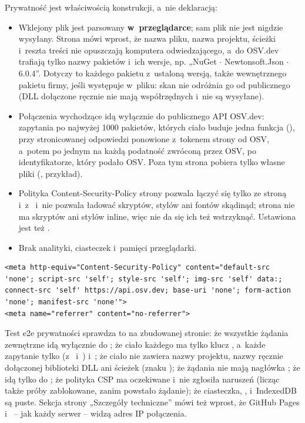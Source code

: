 Prywatność jest właściwością konstrukcji, a~nie deklaracją:

\begin{itemize}
  \item Wklejony plik jest parsowany \textbf{w~przeglądarce}; sam plik nie jest nigdzie
        wysyłany. Strona mówi wprost, że nazwa pliku, nazwa projektu, ścieżki i~reszta
        treści nie opuszczają komputera odwiedzającego, a~do OSV.dev trafiają tylko nazwy
        pakietów i~ich wersje, np. „NuGet $\cdot$ Newtonsoft.Json $\cdot$ 6.0.4”. Dotyczy to
        każdego pakietu z~ustaloną wersją, także wewnętrznego pakietu firmy, jeśli występuje
        w~pliku: skan nie odróżnia go od publicznego (DLL dołączone ręcznie nie mają współrzędnych
        i~nie są wysyłane).
  \item Połączenia wychodzące idą wyłącznie do publicznego API OSV.dev: zapytania
         po najwyżej 1000 pakietów, których ciało buduje jedna funkcja
        (), przy stronicowanej odpowiedzi ponowione z~tokenem strony od
        OSV, a~potem po jednym  na każdą podatność zwróconą przez OSV, po
        identyfikatorze, który podało OSV. Poza tym strona pobiera tylko własne pliki
        (, przykład).
  \item Polityka Content-Security-Policy strony pozwala łączyć się tylko ze stroną
        i~z~ i~nie pozwala ładować skryptów, stylów ani fontów skądinąd; strona
        nie ma skryptów ani stylów inline, więc nie da się ich też wstrzyknąć. Ustawiona jest
        też  .
  \item Brak analityki, ciasteczek i~pamięci przeglądarki.
\end{itemize}

\begin{lstlisting}
<meta http-equiv="Content-Security-Policy" content="default-src 'none'; script-src 'self'; style-src 'self'; img-src 'self' data:; connect-src 'self' https://api.osv.dev; base-uri 'none'; form-action 'none'; manifest-src 'none'">
<meta name="referrer" content="no-referrer">
\end{lstlisting}

Test e2e prywatności sprawdza to na zbudowanej stronie: że wszystkie żądania zewnętrzne idą
wyłącznie do ; że ciało każdego  ma tylko klucz
, a~każde zapytanie tylko  (z~
i~) i~; że ciało nie zawiera nazwy projektu, nazwy ręcznie
dołączonej biblioteki DLL ani ścieżek (znaku \repopath{\textbackslash}); że żądania nie mają
nagłówka ; że  idą tylko do ; że polityka
CSP ma oczekiwane  i~nie zgłosiła naruszeń (licząc także próby
zablokowane, zanim powstało żądanie); że ciasteczka, ,
 i~IndexedDB są puste. Sekcja strony „Szczegóły techniczne” mówi też
wprost, że GitHub Pages i~ -- jak każdy serwer -- widzą adres IP
połączenia.

